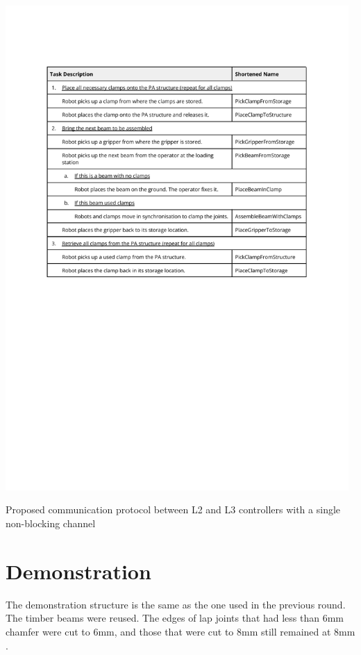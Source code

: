 \begin{table}[!h]
    \includegraphics[page=10, trim=25.4mm 140mm 25.4mm 33mm, clip, width=0.98\textwidth]{tables/Tables in Chapter 6.pdf}
    \caption{Proposed communication protocol between L2 and L3 controllers with a single non-blocking channel}
    \label{table:single-channel-non-blocking-communication-protocol}
\end{table}

\FloatBarrier

\section{Demonstration}
\label{section:exploration-3-demonstration}

The demonstration structure is the same as the one used in the previous round. The timber beams were reused. The edges of lap joints that had less than 6mm chamfer were cut to 6mm, and those that were cut to 8mm still remained at 8mm . 

